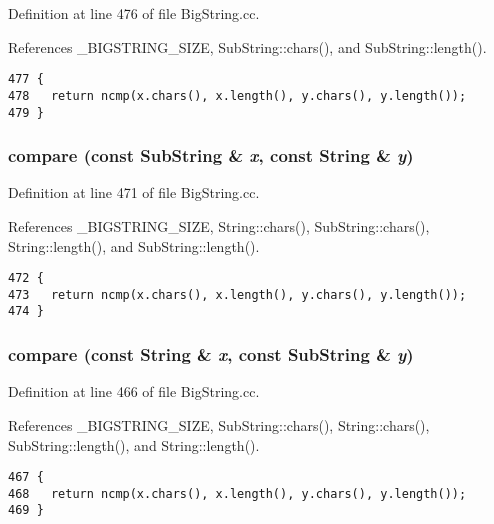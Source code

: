 Definition at line 476 of file Big\-String.cc.

References \_\-BIGSTRING\_\-SIZE, Sub\-String::chars(), and Sub\-String::length().



\footnotesize\begin{verbatim}477 {
478   return ncmp(x.chars(), x.length(), y.chars(), y.length());
479 }
\end{verbatim}\normalsize 
{}
\subsubsection{ compare (const {\bf Sub\-String} \& {\em x}, const {\bf String} \& {\em y})}\label{BigString_8cc_a28}




Definition at line 471 of file Big\-String.cc.

References \_\-BIGSTRING\_\-SIZE, String::chars(), Sub\-String::chars(), String::length(), and Sub\-String::length().



\footnotesize\begin{verbatim}472 {
473   return ncmp(x.chars(), x.length(), y.chars(), y.length());
474 }
\end{verbatim}\normalsize 
{}
\subsubsection{ compare (const {\bf String} \& {\em x}, const {\bf Sub\-String} \& {\em y})}\label{BigString_8cc_a27}




Definition at line 466 of file Big\-String.cc.

References \_\-BIGSTRING\_\-SIZE, Sub\-String::chars(), String::chars(), Sub\-String::length(), and String::length().



\footnotesize\begin{verbatim}467 {
468   return ncmp(x.chars(), x.length(), y.chars(), y.length());
469 }
\end{verbatim}\normalsize 
{}
